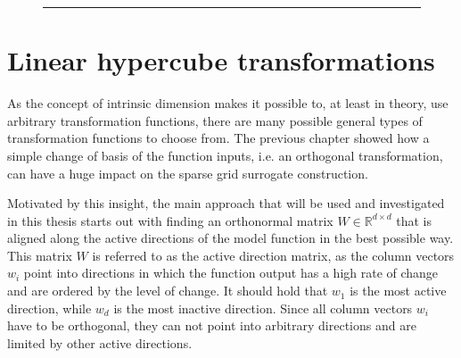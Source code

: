 \documentclass[
  a4paper,  %
  twoside,  %
  bibliography=totoc,
  headsepline,
  cleardoublepage=empty,
  parskip=half,
  draft=false
]{scrbook}
\newcommand{\delimit}{{\color{silver}\noindent\rule{\textwidth}{1pt}}}
\begin{document}
\newpage
\begin{mdframed}[style=style]

\vspace{2.5mm}
\begin{figure}[H]

\centering
{}

\vspace{2.5mm}
\delimit
{}
\label{fig:dim_ranges}
\end{figure}
\end{mdframed}

\section{Linear hypercube transformations}

As the concept of intrinsic dimension makes it possible to, at least in theory, use arbitrary transformation functions, there are many possible general types of transformation functions to choose from.
The previous chapter showed how a simple change of basis of the function inputs, i.e. an orthogonal transformation, can have a huge impact on the sparse grid surrogate construction.

Motivated by this insight, the main approach that will be used and investigated in this thesis starts out with finding an orthonormal matrix $W \in \mathds{R}^{d \times d}$ that is aligned along the active directions of the model function in the best possible way.
This matrix $W$ is referred to as the active direction matrix, as the column vectors $w_i$ point into directions in which the function output has a high rate of change and are ordered by the level of change.
It should hold that $w_1$ is the most active direction, while $w_d$ is the most inactive direction.
Since all column vectors $w_i$ have to be orthogonal, they can not point into arbitrary directions and are limited by other active directions.
\end{document}
